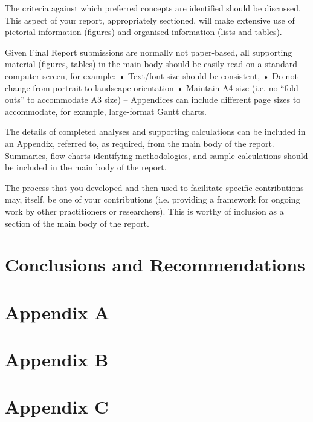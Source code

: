\documentclass[]{article}
\begin{document}
The criteria against which preferred concepts are identified should be discussed.  This aspect of your report, appropriately sectioned, will make extensive use of pictorial information (figures) and organised information (lists and tables).  

Given Final Report submissions are normally not paper-based, all supporting material (figures, tables) in the main body should be easily read on a standard computer screen, for example:
•	Text/font size should be consistent, 
•	Do not change from portrait to landscape orientation 
•	Maintain A4 size (i.e. no “fold outs” to accommodate A3 size) – Appendices can include different page sizes to accommodate, for example, large-format Gantt charts.

The details of completed analyses and supporting calculations can be included in an Appendix, referred to, as required, from the main body of the report.  Summaries, flow charts identifying methodologies, and sample calculations should be included in the main body of the report.

The process that you developed and then used to facilitate specific contributions may, itself, be one of your contributions (i.e. providing a framework for ongoing work by other practitioners or researchers).  This is worthy of inclusion as a section of the main body of the report.

\section{Conclusions and Recommendations}


\newpage


\appendix
\newpage
\section*{Appendix A}


\newpage
\section*{Appendix B}


\section*{Appendix C}

\end{document}

